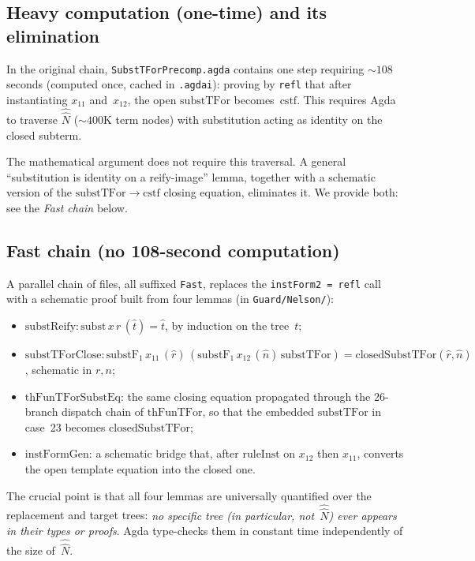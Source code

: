 \documentclass[11pt]{article}
\newcommand{\reify}[1]{\widehat{#1}}
\newcommand{\thFunTFor}{\mathrm{thFunTFor}}
\newcommand{\cstf}{\mathrm{cstf}}
\begin{document}
\subsection*{Heavy computation (one-time) and its elimination}

In the original chain, \texttt{SubstTForPrecomp.agda} contains one
step requiring ${\sim}108$ seconds (computed once, cached in
\texttt{.agdai}): proving by \texttt{refl} that after instantiating
$x_{11}$ and~$x_{12}$, the open $\mathrm{substTFor}$ becomes~$\cstf$.
This requires Agda to traverse $\reify{\hat{N}}$
(${\sim}400$K term nodes) with substitution acting as identity on
the closed subterm.

The mathematical argument does not require this traversal.
A general ``substitution is identity on a $\mathrm{reify}$-image''
lemma, together with a schematic version of the
$\mathrm{substTFor}{\to}\cstf$ closing equation, eliminates it.
We provide both: see the \emph{Fast chain} below.

\subsection*{Fast chain (no 108-second computation)}

A parallel chain of files, all suffixed \texttt{Fast}, replaces
the \texttt{instForm2 = refl} call with a schematic proof built
from four lemmas (in \texttt{Guard/Nelson/}):
\begin{itemize}
\item $\mathrm{substReify} : \mathrm{subst}\,x\,r\,(\reify{t}) = \reify{t}$,
  by induction on the tree~$t$;
\item $\mathrm{substTForClose} : \mathrm{substF}_1\,x_{11}\,(\reify{r})\,
  (\mathrm{substF}_1\,x_{12}\,(\reify{n})\,\mathrm{substTFor}) =
  \mathrm{closedSubstTFor}(\reify{r}, \reify{n})$, schematic in
  $r,n$;
\item $\mathrm{thFunTForSubstEq}$: the same closing equation
  propagated through the 26-branch dispatch chain of
  $\thFunTFor$, so that the embedded $\mathrm{substTFor}$ in
  case~23 becomes $\mathrm{closedSubstTFor}$;
\item $\mathrm{instFormGen}$: a schematic bridge that, after
  $\mathrm{ruleInst}$ on $x_{12}$ then $x_{11}$, converts the
  open template equation into the closed one.
\end{itemize}
The crucial point is that all four lemmas are universally
quantified over the replacement and target trees: \emph{no
specific tree (in particular, not~$\reify{\hat{N}}$) ever appears
in their types or proofs}.  Agda type-checks them in constant
time independently of the size of~$\reify{\hat{N}}$.
\end{document}
